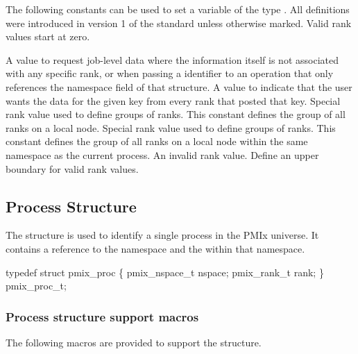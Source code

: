 The following constants can be used to set a variable of the type . All definitions were introduced in version 1 of the standard unless otherwise marked. Valid rank values start at zero.

\begin{constantdesc}
%
A value to request job-level data where the information itself is not associated with any specific rank, or when passing a  identifier to an operation that only references the namespace field of that structure.
%
A value to indicate that the user wants the data for the given key from every rank that posted that key.
%
Special rank value used to define groups of ranks.
This constant defines the group of all ranks on a local node.
%
Special rank value used to define groups of ranks.
This constant defines the group of all ranks on a local node within the same namespace as the current process.
%
An invalid rank value.
%
Define an upper boundary for valid rank values.
%
\end{constantdesc}


\subsection{Process Structure}

The  structure is used to identify a single process in the PMIx universe.
It contains a reference to the namespace and the  within that namespace.

\cspecificstart
\begin{codepar}
typedef struct pmix_proc \{
    pmix_nspace_t nspace;
    pmix_rank_t rank;
\} pmix_proc_t;
\end{codepar}
\cspecificend

\subsubsection{Process structure support macros}
The following macros are provided to support the  structure.



